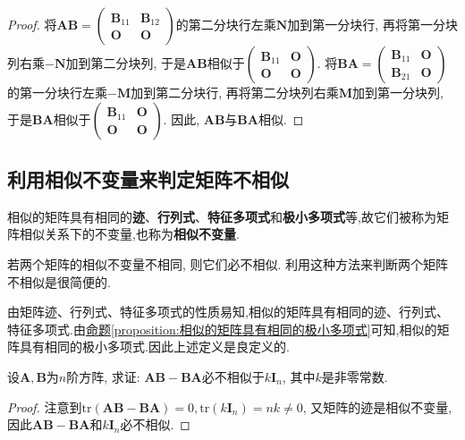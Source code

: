 \documentclass[../../main.tex]{subfiles}
\begin{document}
\begin{proof}
将\(\boldsymbol{AB}=\begin{pmatrix}\boldsymbol{B}_{11}&\boldsymbol{B}_{12}\\\boldsymbol{O}&\boldsymbol{O}\end{pmatrix}\)的第二分块行左乘\(\boldsymbol{N}\)加到第一分块行, 再将第一分块列右乘\(-\boldsymbol{N}\)加到第二分块列, 于是\(\boldsymbol{AB}\)相似于\(\begin{pmatrix}\boldsymbol{B}_{11}&\boldsymbol{O}\\\boldsymbol{O}&\boldsymbol{O}\end{pmatrix}\). 将\(\boldsymbol{BA}=\begin{pmatrix}\boldsymbol{B}_{11}&\boldsymbol{O}\\\boldsymbol{B}_{21}&\boldsymbol{O}\end{pmatrix}\)的第一分块行左乘\(-\boldsymbol{M}\)加到第二分块行, 再将第二分块列右乘\(\boldsymbol{M}\)加到第一分块列, 于是\(\boldsymbol{BA}\)相似于\(\begin{pmatrix}\boldsymbol{B}_{11}&\boldsymbol{O}\\\boldsymbol{O}&\boldsymbol{O}\end{pmatrix}\). 因此, \(\boldsymbol{AB}\)与\(\boldsymbol{BA}\)相似.
\end{proof}

\subsection{利用相似不变量来判定矩阵不相似}

\begin{definition}[相似不变量]
相似的矩阵具有相同的\textbf{迹}、\textbf{行列式}、\textbf{特征多项式}和\textbf{极小多项式}等,故它们被称为矩阵相似关系下的不变量,也称为\textbf{相似不变量}. 
\end{definition}
\begin{remark}
若两个矩阵的相似不变量不相同, 则它们必不相似. 利用这种方法来判断两个矩阵不相似是很简便的. 
\end{remark}
\begin{note}
由矩阵迹、行列式、特征多项式的性质易知,相似的矩阵具有相同的迹、行列式、特征多项式.由\hyperref[proposition:相似的矩阵具有相同的极小多项式]{命题\ref{proposition:相似的矩阵具有相同的极小多项式}}可知,相似的矩阵具有相同的极小多项式.因此上述定义是良定义的.
\end{note}

\begin{example}
设\(\boldsymbol{A},\boldsymbol{B}\)为\(n\)阶方阵, 求证: \(\boldsymbol{AB}-\boldsymbol{BA}\)必不相似于\(k\boldsymbol{I}_{n}\), 其中\(k\)是非零常数.
\end{example}
\begin{proof}
注意到\(\mathrm{tr}(\boldsymbol{AB}-\boldsymbol{BA}) = 0,\mathrm{tr}(k\boldsymbol{I}_{n}) = nk\neq 0\), 又矩阵的迹是相似不变量, 因此\(\boldsymbol{AB}-\boldsymbol{BA}\)和\(k\boldsymbol{I}_{n}\)必不相似.
\end{proof}
\end{document}
